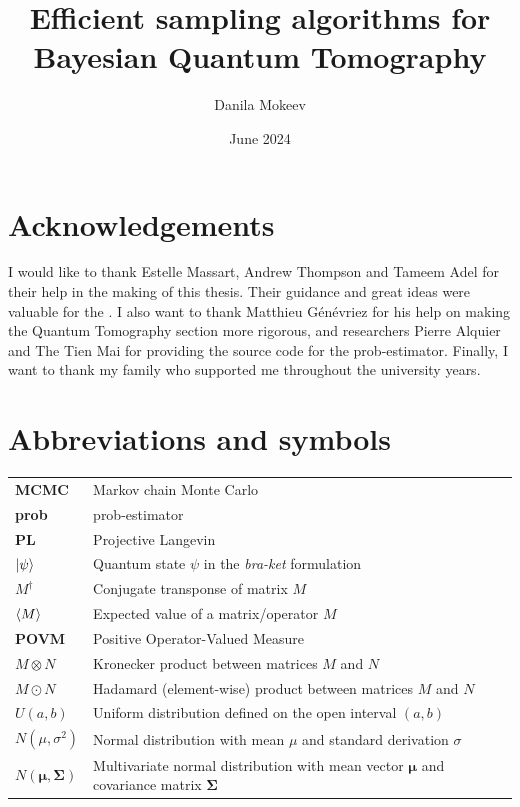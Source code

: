 \documentclass[12pt]{memoir}
\title{Efficient sampling algorithms for Bayesian Quantum Tomography}
\author{Danila Mokeev}
\date{June 2024}
\newcommand{\tb}{\textbf}
\newcommand{\ti}{\textit}
\begin{document}

\maketitle


\newpage

\chapter*{Acknowledgements}
I would like to thank Estelle Massart, Andrew Thompson and Tameem Adel for their help in the making of this thesis. Their guidance and great ideas were valuable for the . I also want to thank Matthieu Génévriez for his help on making the Quantum Tomography section more rigorous, and researchers Pierre Alquier and The Tien Mai for providing the source code for the prob-estimator. Finally, I want to thank my family who supported me throughout the university years.
\newpage

\tableofcontents*

\newpage

\chapter*{Abbreviations and symbols}
\begin{tabular}{ll}
\tb{MCMC} & Markov chain Monte Carlo\\
\tb{prob} & prob-estimator\\
\tb{PL}& Projective Langevin  \\
$\ket{{\psi}}$ & Quantum state $\psi$ in the \ti{bra-ket} formulation\\
${M^\dagger}$ & Conjugate transponse of matrix $M$\\
$\braket{M}$ & Expected value of a matrix/operator $M$\\
\tb {POVM} & Positive Operator-Valued Measure\\
${M\otimes N}$ & Kronecker product between matrices $M$ and $N$\\
${M \odot N}$ & Hadamard (element-wise) product between matrices $M$ and $N$\\
${U}(a,b)$ & Uniform distribution defined on the open interval $(a,b)$\\
$N(\mu, \sigma^2)$ & Normal distribution with mean $\mu$ and standard derivation $\sigma$\\
$N(\boldsymbol{\mu},\boldsymbol{\Sigma})$ & Multivariate normal distribution with mean vector $\boldsymbol{\mu}$ and covariance matrix $\boldsymbol{\Sigma}$ 
\end{tabular}
\end{document}
